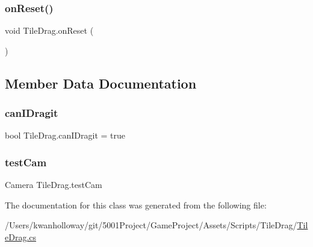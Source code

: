 \mbox{\label{class_tile_drag_a1e6de5920e24560c0e2dc78663d476de}} 
\subsubsection{\texorpdfstring{on\+Reset()}{onReset()}}
{\footnotesize\ttfamily void Tile\+Drag.\+on\+Reset (\begin{DoxyParamCaption}{ }\end{DoxyParamCaption})}



\subsection{Member Data Documentation}
\mbox{\label{class_tile_drag_a24edf4664b06aaffd113f728a57867e3}} 
\subsubsection{\texorpdfstring{can\+I\+Dragit}{canIDragit}}
{\footnotesize\ttfamily bool Tile\+Drag.\+can\+I\+Dragit = true}

\mbox{\label{class_tile_drag_ade5547217c689f6d09d444bda707d1b3}} 
\subsubsection{\texorpdfstring{test\+Cam}{testCam}}
{\footnotesize\ttfamily Camera Tile\+Drag.\+test\+Cam}



The documentation for this class was generated from the following file\+:\begin{DoxyCompactItemize}
\item 
/\+Users/kwanholloway/git/5001\+Project/\+Game\+Project/\+Assets/\+Scripts/\+Tile\+Drag/\hyperlink{_tile_drag_8cs}{Tile\+Drag.\+cs}\end{DoxyCompactItemize}
